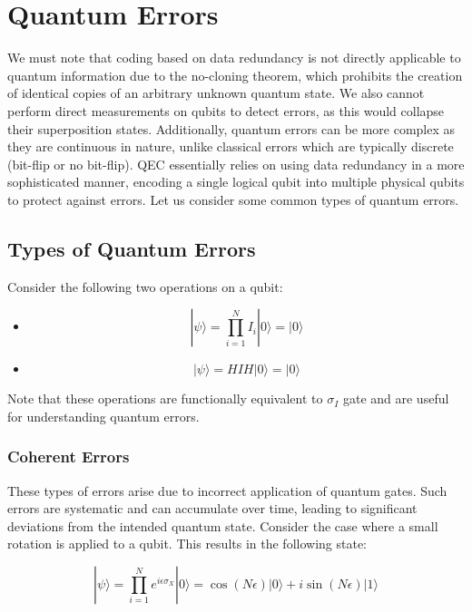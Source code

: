 \documentclass[conference]{IEEEtran}
\begin{document}
\section{Quantum Errors}
We must note that coding based on data redundancy is not directly applicable to quantum information due to the no-cloning theorem, which prohibits the creation of identical copies of an arbitrary unknown quantum state. We also cannot perform direct measurements on qubits to detect errors, as this would collapse their superposition states. Additionally, quantum errors can be more complex as they are continuous in nature, unlike classical errors which are typically discrete (bit-flip or no bit-flip). QEC essentially relies on using data redundancy in a more sophisticated manner, encoding a single logical qubit into multiple physical qubits to protect against errors. Let us consider some common types of quantum errors.

\subsection{Types of Quantum Errors}

Consider the following two operations on a qubit:
\begin{itemize}
    \item \begin{equation}
        | \psi \rangle = \prod_{i = 1}^{N} I_i |0\rangle = |0 \rangle
    \end{equation}

    \item \begin{equation}
        | \psi \rangle = HIH |0\rangle = |0 \rangle
    \end{equation}
\end{itemize}

Note that these operations are functionally equivalent to $\sigma_I$ gate and are useful for understanding quantum errors.
\vspace{4pt}
\subsubsection{Coherent Errors}
These types of errors arise due to incorrect application of quantum gates. Such errors are systematic and can accumulate over time, leading to significant deviations from the intended quantum state. Consider the case where a small rotation is applied to a qubit. This results in the following state:

\begin{equation}
    | \psi \rangle = \prod_{i = 1}^{N} e^{i \epsilon \sigma_X} |0\rangle = \cos(N \epsilon ) |0\rangle + i \sin(N \epsilon) |1\rangle
\end{equation}
\end{document}
